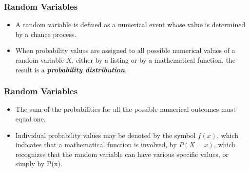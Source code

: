 \documentclass[IntroMain.tex]{subfiles}
\begin{document}
\begin{frame}
	\frametitle{Random Variables}
	\vspace{-1cm}
	\Large
	\begin{itemize}
		\item A random variable is defined as a numerical event whose value is determined by a chance process.
		\item When probability values are assigned to all possible numerical values of a random variable $X$, either by a listing
		or by a mathematical function, the result is a \textit{\textbf{probability distribution}}. 
	\end{itemize}
\end{frame}
\begin{frame}
	\frametitle{Random Variables}
	\Large
	\vspace{-1cm}
	\begin{itemize}
		\item The sum of the probabilities for all the possible numerical outcomes must equal one. 
		\item Individual probability values may be denoted by the symbol $f(x)$,
		which indicates that a mathematical function is involved, by $P(X=x)$, which recognizes that the random
		variable can have various specific values, or simply by P(x).
	\end{itemize}
\end{frame}
\end{document}
